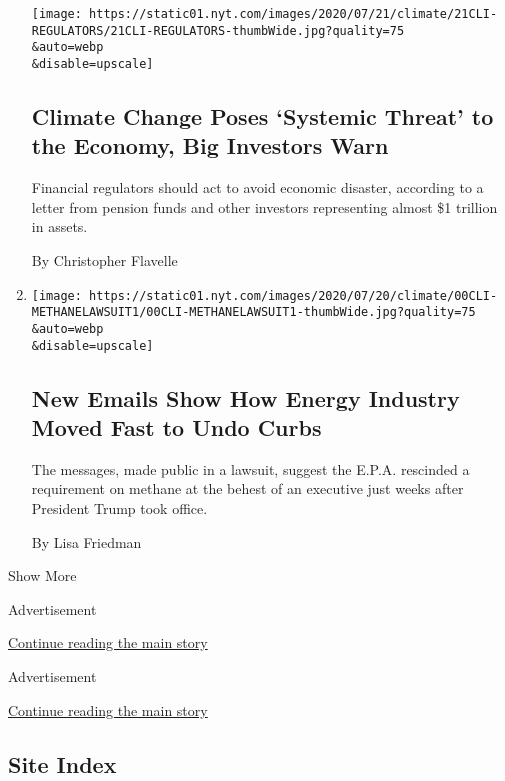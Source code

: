 \begin{enumerate}
  \texttt{[image: https://static01.nyt.com/images/2020/07/21/climate/21CLI-REGULATORS/21CLI-REGULATORS-thumbWide.jpg?quality=75\\\&auto=webp\\\&disable=upscale]}

  \hypertarget{climate-change-poses-systemic-threat-to-the-economy-big-investors-warn}{%
  \subsection{Climate Change Poses `Systemic Threat' to the Economy, Big
  Investors
  Warn}\label{climate-change-poses-systemic-threat-to-the-economy-big-investors-warn}}

  Financial regulators should act to avoid economic disaster, according
  to a letter from pension funds and other investors representing almost
  \$1 trillion in assets.

  By Christopher Flavelle
\item
  \href{/2020/07/21/climate/trump-methane-climate-change.html}{}

  \texttt{[image: https://static01.nyt.com/images/2020/07/20/climate/00CLI-METHANELAWSUIT1/00CLI-METHANELAWSUIT1-thumbWide.jpg?quality=75\\\&auto=webp\\\&disable=upscale]}

  \hypertarget{new-emails-show-how-energy-industry-moved-fast-to-undo-curbs}{%
  \subsection{New Emails Show How Energy Industry Moved Fast to Undo
  Curbs}\label{new-emails-show-how-energy-industry-moved-fast-to-undo-curbs}}

  The messages, made public in a lawsuit, suggest the E.P.A. rescinded a
  requirement on methane at the behest of an executive just weeks after
  President Trump took office.

  By Lisa Friedman
\end{enumerate}

Show More

Advertisement

\protect\hyperlink{after-mid1}{Continue reading the main story}

Advertisement

\protect\hyperlink{after-mktg}{Continue reading the main story}

\hypertarget{site-index}{%
\subsection{Site Index}\label{site-index}}


